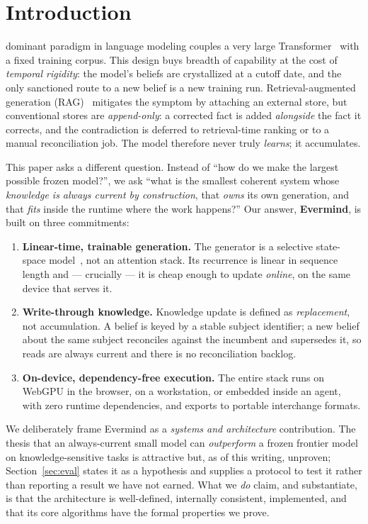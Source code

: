 \documentclass[journal,onecolumn,11pt]{IEEEtran}
\begin{document}
\section{Introduction}
 dominant paradigm in language modeling couples a very large
Transformer~\cite{vaswani2017} with a fixed training corpus. This design buys
breadth of capability at the cost of \emph{temporal rigidity}: the model's beliefs
are crystallized at a cutoff date, and the only sanctioned route to a new belief
is a new training run. Retrieval-augmented generation (RAG)~\cite{lewis2020}
mitigates the symptom by attaching an external store, but conventional stores are
\emph{append-only}: a corrected fact is added \emph{alongside} the fact it
corrects, and the contradiction is deferred to retrieval-time ranking or to a
manual reconciliation job. The model therefore never truly \emph{learns}; it
accumulates.

This paper asks a different question. Instead of ``how do we make the largest
possible frozen model?'', we ask ``what is the smallest coherent system whose
\emph{knowledge is always current by construction}, that \emph{owns} its own
generation, and that \emph{fits} inside the runtime where the work happens?''
Our answer, \textbf{Evermind}, is built on three commitments:

\begin{enumerate}
\item \textbf{Linear-time, trainable generation.} The generator is a selective
state-space model~\cite{gu2023mamba,dao2024mamba2}, not an attention stack. Its
recurrence is linear in sequence length and --- crucially --- it is cheap enough
to update \emph{online}, on the same device that serves it.
\item \textbf{Write-through knowledge.} Knowledge update is defined as
\emph{replacement}, not accumulation. A belief is keyed by a stable subject
identifier; a new belief about the same subject reconciles against the incumbent
and supersedes it, so reads are always current and there is no reconciliation
backlog.
\item \textbf{On-device, dependency-free execution.} The entire stack runs on
WebGPU in the browser, on a workstation, or embedded inside an agent, with zero
runtime dependencies, and exports to portable interchange formats.
\end{enumerate}

We deliberately frame Evermind as a \emph{systems and architecture} contribution.
The thesis that an always-current small model can \emph{outperform} a frozen
frontier model on knowledge-sensitive tasks is attractive but, as of this
writing, unproven; Section~\ref{sec:eval} states it as a hypothesis and supplies
a protocol to test it rather than reporting a result we have not earned. What we
\emph{do} claim, and substantiate, is that the architecture is well-defined,
internally consistent, implemented, and that its core algorithms have the formal
properties we prove.
\end{document}
